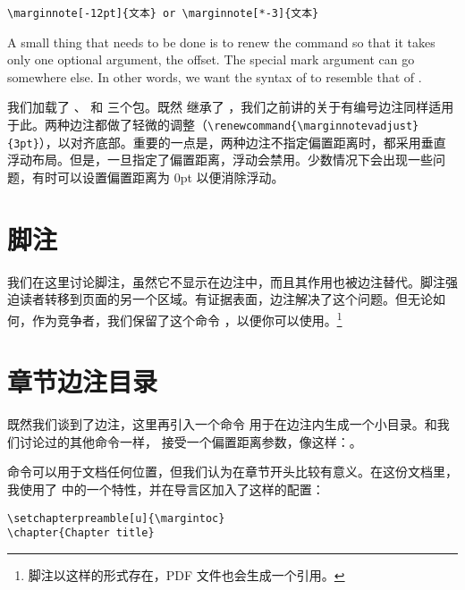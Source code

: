 \begin{lstlisting}[style=kaolstplain]
\marginnote[-12pt]{文本} or \marginnote[*-3]{文本}
\end{lstlisting}

\begin{kaobox}[frametitle=To Do]
A small thing that needs to be done is to renew the 
command so that it takes only one optional argument, the offset. The
special mark argument can go somewhere else. In other words, we want the
syntax of  to resemble that of .
\end{kaobox}

我们加载了 、 和  三个包。既然  继承了 ，我们之前讲的关于有编号边注同样适用于此。两种边注都做了轻微的调整（\texttt{\textbackslash renewcommand\{\textbackslash marginnote\linebreak vadjust\}\{3pt\}}），以对齐底部。重要的一点是，两种边注不指定偏置距离时，都采用垂直浮动布局。但是，一旦指定了偏置距离，浮动会禁用。少数情况下会出现一些问题，有时可以设置偏置距离为 0pt 以便消除浮动。

\section{脚注}

我们在这里讨论脚注，虽然它不显示在边注中，而且其作用也被边注替代。脚注强迫读者转移到页面的另一个区域。有证据表面，边注解决了这个问题。但无论如何，作为竞争者，我们保留了这个命令 ，以便你可以使用。\footnote{脚注以这样的形式存在，PDF 文件也会生成一个引用。}

\section{章节边注目录}

既然我们谈到了边注，这里再引入一个命令  用于在边注内生成一个小目录。和我们讨论过的其他命令一样， 接受一个偏置距离参数，像这样：。

命令可以用于文档任何位置，但我们认为在章节开头比较有意义。在这份文档里，我使用了 \KOMAScript 中的一个特性，并在导言区加入了这样的配置：


\begin{lstlisting}[style=kaolstplain]
\setchapterpreamble[u]{\margintoc}
\chapter{Chapter title}
\end{lstlisting}


